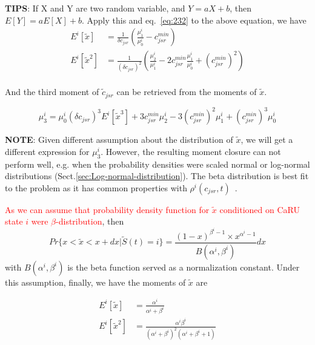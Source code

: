 {\bf TIPS}: If X and Y are two random variable, and $Y= aX +b$, then
$E[Y] = aE[X] + b$. Apply this and eq.~\eqref{eq:232} to the above
equation, we have
\begin{equation}
  \label{eq:250}
  \begin{split}
    E^i[\tilde{x}] &= \frac{1}{\delta c_{jsr}}
    (\frac{\mu^i_1}{\mu^i_0} - c^{min}_{jsr}) \\
    E^i[\tilde{x}^2] &= \frac{1}{(\delta c_{jsr})^2}
    (\frac{\mu^i_2}{\mu^i_1} - 2c^{min}_{jsr}\frac{\mu^i_1}{\mu^i_0}
    + (c^{min}_{jsr})^2) \\
  \end{split}
\end{equation}

And the third moment of $\tilde{c}_{jsr}$ can be retrieved from the
moments of $\tilde{x}$.

\begin{equation}
  \label{eq:249}
  \mu^i_3 = \mu^i_0(\delta c_{jsr})^3 E^i[\tilde{x}^3] + 3
  c^{min}_{jsr} \mu^i_2 - 3 (c^{min}_{jsr})^2 \mu^i_1 + (c^{min}_{jsr})^3 \mu^i_0
\end{equation}

{\bf NOTE}: Given different assumption about the distribution of $\tilde{x}$, we
will get a different expression for $\mu^i_3$. However, the resulting moment
closure can not perform well, e.g. when the probability densities were scaled
normal or log-normal distributions (Sect.\ref{sec:Log-normal-distribution}). The
beta distribution is best fit to the problem as it has common properties with
$\rho^i(c_{jsr},t)$~\citep{williams2008mclc}.


\textcolor{red}{As we can assume that probability density function for
  $\tilde{x}$ conditioned on CaRU state $i$ were
  $\beta$-distribution}, then
\begin{equation}
  \label{eq:248}
  Pr \{x < \tilde{x} < x+dx| \tilde{S}(t) = i \} =
  \frac{(1-x)^{\beta^i - 1}\times x^{\alpha^i - 1}}{B(\alpha^i,
    \beta^i)} dx
\end{equation}
with $B(\alpha^i, \beta^i)$ is the beta function served as a
normalization constant.  Under this assumption, finally, we have
the moments of $\tilde{x}$ are

\begin{equation}
  \label{eq:239}
  \begin{split}
    E^i[\tilde{x}] &= \frac{\alpha^i}{\alpha^i + \beta^i} \\
    E^i[\tilde{x}^2] &= \frac{\alpha^i\beta^i}{(\alpha^i +
      \beta^i)^2(\alpha^i + \beta^i + 1)} \\
  \end{split}
\end{equation}


